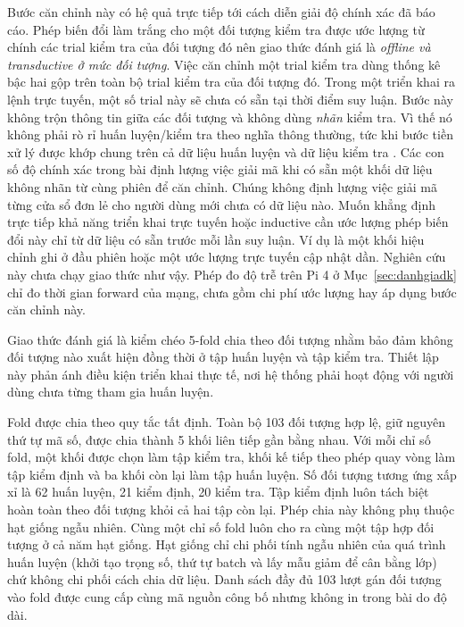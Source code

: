Bước căn chỉnh này có hệ quả trực tiếp tới cách diễn giải độ chính xác đã
báo cáo. Phép biến đổi làm trắng cho một đối tượng kiểm tra được ước lượng từ chính
các trial kiểm tra của đối tượng đó nên giao thức đánh giá là \emph{offline
và transductive ở mức đối tượng}. Việc căn chỉnh một trial kiểm tra dùng
thống kê bậc hai gộp trên toàn bộ trial kiểm tra của đối tượng đó. Trong một
triển khai ra lệnh trực tuyến, một số trial này sẽ chưa có sẵn tại thời điểm
suy luận. Bước này không trộn thông tin giữa các đối tượng và không dùng
\emph{nhãn} kiểm tra. Vì thế nó không phải rò rỉ huấn luyện/kiểm tra theo
nghĩa thông thường, tức khi bước tiền xử lý được khớp chung trên cả dữ liệu
huấn luyện và dữ liệu kiểm tra \cite{kapoor2023leakage}. Các con số độ chính
xác trong bài định lượng việc giải mã khi có sẵn một khối dữ liệu không nhãn
từ cùng phiên để căn chỉnh. Chúng không định lượng việc giải mã từng cửa sổ
đơn lẻ cho người dùng mới chưa có dữ liệu nào. Muốn khẳng định trực tiếp khả
năng triển khai trực tuyến hoặc inductive cần ước lượng phép biến đổi này
chỉ từ dữ liệu có sẵn trước mỗi lần suy luận. Ví dụ là một khối hiệu chỉnh
ghi ở đầu phiên hoặc một ước lượng trực tuyến cập nhật dần. Nghiên cứu này
chưa chạy giao thức như vậy. Phép đo độ trễ trên
Pi 4 ở Mục~\ref{sec:danhgiadk} chỉ đo thời gian forward của mạng,
chưa gồm chi phí ước lượng hay áp dụng bước căn chỉnh này.

Giao thức đánh giá là kiểm chéo 5-fold chia theo đối tượng nhằm bảo đảm không
đối tượng nào xuất hiện đồng thời ở tập huấn luyện và tập kiểm tra. Thiết
lập này phản ánh điều kiện triển khai thực tế, nơi hệ thống phải hoạt động
với người dùng chưa từng tham gia huấn luyện.

Fold được chia theo quy tắc tất định. Toàn bộ 103
đối tượng hợp lệ, giữ nguyên thứ tự mã số, được chia thành 5 khối liên
tiếp gần bằng nhau. Với mỗi chỉ số fold, một khối được chọn làm tập kiểm tra, khối kế tiếp theo phép quay vòng làm tập kiểm định và ba khối còn lại làm tập huấn
luyện. Số đối tượng tương ứng xấp xỉ là 62 huấn luyện, 21 kiểm định, 20 kiểm tra. Tập kiểm định luôn tách biệt hoàn toàn theo đối tượng khỏi cả hai tập còn lại. Phép
chia này không phụ thuộc hạt giống ngẫu nhiên. Cùng một chỉ số fold luôn
cho ra cùng một tập hợp đối tượng ở cả năm hạt giống. Hạt giống chỉ chi phối tính ngẫu nhiên của quá trình huấn luyện (khởi tạo
trọng số, thứ tự batch và lấy mẫu giảm để cân bằng lớp) chứ không chi phối
cách chia dữ liệu. Danh sách đầy đủ 103 lượt gán đối tượng
vào fold được cung cấp cùng mã nguồn công bố nhưng không in trong bài do độ dài.

